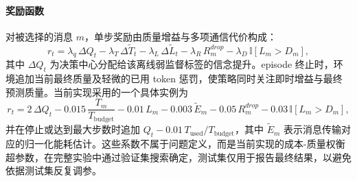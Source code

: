 \paragraph{奖励函数}
对被选择的消息 $m$，单步奖励由质量增益与多项通信代价构成：
\begin{equation}
r_t=\lambda_q\,\Delta Q_t-\lambda_T\,\Delta\tilde{T}_t-\lambda_L\,\Delta\tilde{L}_t-\lambda_R\,R_m^{drop}-\lambda_D\,\mathbb{I}[L_m>D_m],
\end{equation}
其中 $\Delta Q_t$ 为决策中心分配给该离线弱监督标签的信念提升。episode 终止时，环境追加当前最终质量及轻微的已用 token 惩罚，使策略同时关注即时增益与最终预测质量。当前实现采用的一个具体实例为
\begin{equation}
r_t=2\,\Delta Q_t-0.015\,\frac{T_m}{T_{\mathrm{budget}}}-0.01\,L_m-0.003\,\tilde{E}_m-0.05\,R_m^{drop}-0.03\,\mathbb{I}[L_m>D_m],
\end{equation}
并在停止或达到最大步数时追加 $Q_t-0.01\,T_{\mathrm{used}}/T_{\mathrm{budget}}$，其中 $\tilde{E}_m$ 表示消息传输对应的归一化能耗估计。这些系数不属于问题定义，而是当前实现的成本-质量权衡超参数，在完整实验中通过验证集搜索确定，测试集仅用于报告最终结果，以避免依据测试集反复调参。
